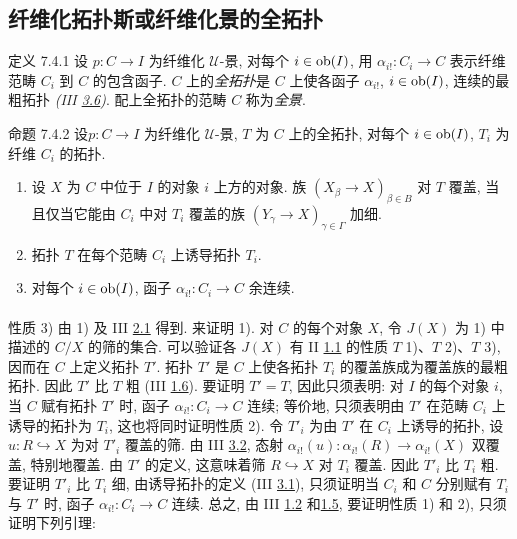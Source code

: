 \subsection{纤维化拓扑斯或纤维化景的全拓扑}

\begin{enonce*}{定义 7.4.1}
设 $p:C\to I$ 为纤维化 $𝒰$-景,
对每个 $i\in\operatorname{ob}(I)$, 用 $\alpha_{i!}:C_i\to C$
表示纤维范畴 $C_i$ 到 $C$ 的包含函子.
$C$ 上的\emph{全拓扑}是 $C$ 上使各函子 $\alpha_{i!}$, $i\in\operatorname{ob}(I)$,
连续的最粗拓扑 \emph{(III \hyperref[III.prop3.6]{3.6})}.
配上全拓扑的范畴 $C$ 称为\emph{全景}.
\end{enonce*}

\begin{enonce*}{命题 7.4.2}
设\pageoriginale $p:C\to I$ 为纤维化 $𝒰$-景,
$T$ 为 $C$ 上的全拓扑, 对每个 $i\in\operatorname{ob}(I)$,
$T_i$ 为纤维 $C_i$ 的拓扑.
\begin{enumerate}
\renewcommand{\labelenumi}{\theenumi)}
\item 设 $X$ 为 $C$ 中位于 $I$ 的对象 $i$ 上方的对象.
族 $(X_\beta\to X)_{\beta\in B}$ 对 $T$ 覆盖,
当且仅当它能由 $C_i$ 中对 $T_i$ 覆盖的族
$(Y_{\gamma}\to X)_{\gamma\in\Gamma}$ 加细.

\item 拓扑 $T$ 在每个范畴 $C_i$ 上诱导拓扑 $T_i$.

\item 对每个 $i\in\operatorname{ob}(I)$, 函子 $\alpha_{i!}:C_i\to C$ 余连续.
\end{enumerate}
\end{enonce*}

\setcounter{subsubsection}{2}
\setcounter{paragraph}{0}
\paragraph{}

性质 3) 由 1) 及 III \hyperref[III.def2.1]{2.1} 得到.
来证明 1).
对 $C$ 的每个对象 $X$, 令 $J(X)$ 为 1) 中描述的 $C/X$ 的筛的集合.
可以验证各 $J(X)$ 有 II \hyperref[II.def1.1]{1.1} 的性质 $T$ 1)、$T$ 2)、$T$ 3),
因而在 $C$ 上定义拓扑 $T'$.
拓扑 $T'$ 是 $C$ 上使各拓扑 $T_i$ 的覆盖族成为覆盖族的最粗拓扑.
因此 $T'$ 比 $T$ 粗 (III \hyperref[III.prop1.6]{1.6}).
要证明 $T'=T$, 因此只须表明: 对 $I$ 的每个对象 $i$,
当 $C$ 赋有拓扑 $T'$ 时, 函子 $\alpha_{i!}:C_i\to C$ 连续;
等价地, 只须表明由 $T'$ 在范畴 $C_i$ 上诱导的拓扑为 $T_i$,
这也将同时证明性质 2).
令 $T'_i$ 为由 $T'$ 在 $C_i$ 上诱导的拓扑,
设 $u:R\hookrightarrow X$ 为对 $T'_i$ 覆盖的筛.
由 III \hyperref[III.prop3.2]{3.2},
态射 $\alpha_{i!}(u):\alpha_{i!}(R)\to\alpha_{i!}(X)$ 双覆盖, 特别地覆盖.
由 $T'$ 的定义, 这意味着筛 $R\hookrightarrow X$ 对 $T_i$ 覆盖.
因此 $T'_i$ 比 $T_i$ 粗.
要证明 $T'_i$ 比 $T_i$ 细, 由诱导拓扑的定义 (III \hyperref[III.subsec3.1]{3.1}),
只须证明当 $C_i$ 和 $C$ 分别赋有 $T_i$ 与 $T'$ 时,
函子 $\alpha_{i!}:C_i\to C$ 连续.
总之, 由 III \hyperref[III.prop1.2]{1.2} 和\hyperref[III.prop1.5]{1.5},
要证明性质 1) 和 2), 只须证明下列引理:

